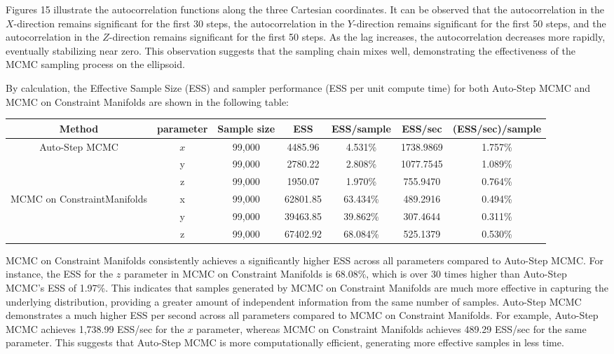 \documentclass{article}
\begin{document}
Figures 15 illustrate the autocorrelation functions along the three Cartesian coordinates. It can be observed that the autocorrelation in the \(X\)-direction remains significant for the first 30 steps, the autocorrelation in the \(Y\)-direction remains significant for the first 50 steps, and the autocorrelation in the \(Z\)-direction remains significant for the first 50 steps. As the lag increases, the autocorrelation decreases more rapidly, eventually stabilizing near zero. This observation suggests that the sampling chain mixes well, demonstrating the effectiveness of the MCMC sampling process on the ellipsoid.



By calculation, the Effective Sample Size (ESS) and sampler performance (ESS per unit compute time) for both Auto-Step MCMC and MCMC on Constraint Manifolds are shown in the following table:


\begin{center}
\begin{tabular}{ |c|c|c|c|c|c|c| } 
\hline
Method & parameter &Sample size& ESS & ESS/sample & ESS/sec & (ESS/sec)/sample  \\
\hline
\multirow{3}{5em}{Auto-Step MCMC} & $x $& 99,000 & 4485.96 & 4.531\% & 1738.9869 & 1.757\%\\ 

&y & 99,000 & 2780.22 & 2.808\% & 1077.7545 & 1.089\% \\

&z & 99,000 & 1950.07 & 1.970\% & 755.9470&  0.764\%\\
\hline
\multirow{2}{9em}{MCMC on ConstraintManifolds} & x & 99,000 & 62801.85 & 63.434\% & 489.2916 & 0.494\%\\

& y & 99,000 & 39463.85 & 39.862\% & 307.4644 & 0.311\% \\ 
&z & 99,000 & 67402.92 & 68.084\% & 525.1379 & 0.530\%\\


\hline
\hline
\end{tabular}
\end{center}

MCMC on Constraint Manifolds consistently achieves a significantly higher ESS across all parameters compared to Auto-Step MCMC. For instance, the ESS for the $z$ parameter in MCMC on Constraint Manifolds is 68.08\%, which is over 30 times higher than Auto-Step MCMC's ESS of 1.97\%. This indicates that samples generated by MCMC on Constraint Manifolds are much more effective in capturing the underlying distribution, providing a greater amount of independent information from the same number of samples. Auto-Step MCMC demonstrates a much higher ESS per second across all parameters compared to MCMC on Constraint Manifolds. For example, Auto-Step MCMC achieves 1,738.99 ESS/sec for the $x$ parameter, whereas MCMC on Constraint Manifolds achieves 489.29 ESS/sec for the same parameter. This suggests that Auto-Step MCMC is more computationally efficient, generating more effective samples in less time.
\end{document}
